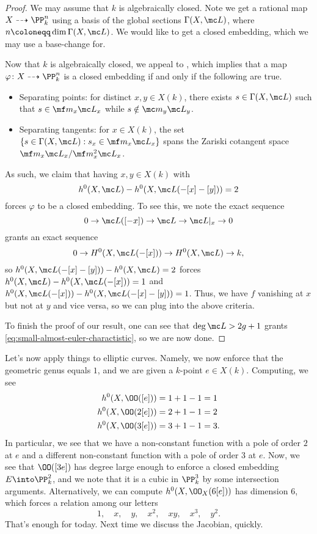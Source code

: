 \documentclass[../notes.tex]{subfiles}
\begin{document}
\begin{proof}
	We may assume that $k$ is algebraically closed. Note we get a rational map $X\dashrightarrow\PP^n_k$ using a basis of the global sections $\Gamma(X,\mc L)$, where $n\coloneqq\dim\Gamma(X,\mc L)$. We would like to get a closed embedding, which we may use a base-change for.

	Now that $k$ is algebraically closed, we appeal to \cite[Proposition~7.3]{hartshorne}, which implies that a map $\varphi\colon X\dashrightarrow\PP^n_k$ is a closed embedding if and only if the following are true.
	\begin{itemize}
		\item Separating points: for distinct $x,y\in X(k)$, there exists $s\in\Gamma(X,\mc L)$ such that $s\in\mf m_x\mc L_x$ while $s\notin\mc m_y\mc L_y$.
		\item Separating tangents: for $x\in X(k)$, the set $\{s\in\Gamma(X,\mc L):s_x\in\mf m_x\mc L_x\}$ spans the Zariski cotangent space $\mf m_x\mc L_x/\mf m_x^2\mc L_x$.
	\end{itemize}
	As such, we claim that having $x,y\in X(k)$ with
	\begin{equation}
		h^0(X,\mc L)-h^0(X,\mc L(-[x]-[y]))=2 \label{eq:small-almost-euler-charactistic}
	\end{equation}
	forces $\varphi$ to be a closed embedding. To see this, we note the exact sequence
	\[0\to\mc L([-x])\to\mc L\to\mc L|_x\to0\]
	grants an exact sequence
	\[0\to H^0(X,\mc L(-[x]))\to H^0(X,\mc L)\to k,\]
	so $h^0(X,\mc L(-[x]-[y]))-h^0(X,\mc L)=2$ forces $h^0(X,\mc L)-h^0(X,\mc L(-[x]))=1$ and $h^0(X,\mc L(-[x]))-h^0(X,\mc L(-[x]-[y]))=1$. Thus, we have $f$ vanishing at $x$ but not at $y$ and vice versa, so we can plug into the above criteria.

	To finish the proof of our result, one can see that $\deg\mc L>2g+1$ grants \autoref{eq:small-almost-euler-charactistic}, so we are now done.
\end{proof}
Let's now apply things to elliptic curves. Namely, we now enforce that the geometric genus equals $1$, and we are given a $k$-point $e\in X(k)$. Computing, we see
\begin{align*}
	h^0(X,\OO([e])) &= 1+1-1=1 \\
	h^0(X,\OO(2[e])) &= 2+1-1=2 \\
	h^0(X,\OO(3[e])) &= 3+1-1=3.
\end{align*}
In particular, we see that we have a non-constant function with a pole of order $2$ at $e$ and a different non-constant function with a pole of order $3$ at $e$. Now, we see that $\OO([3e])$ has degree large enough to enforce a closed embedding $E\into\PP^2_k$, and we note that it is a cubic in $\PP^3_k$ by some intersection arguments. Alternatively, we can compute $h^0(X,\OO_X(6[e]))$ has dimension $6$, which forces a relation among our letters
\[1,\quad x,\quad y,\quad x^2,\quad xy,\quad x^3,\quad y^2.\]
That's enough for today. Next time we discuss the Jacobian, quickly.
\end{document}
